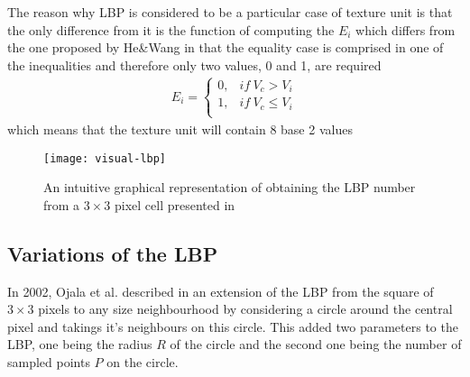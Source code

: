 The reason why LBP is considered to be a particular case of texture unit is that the only difference from it is the function of computing the $E_i$ which differs from the one proposed by He\&Wang in that the equality case is comprised in one of the inequalities and therefore only two values, 0 and 1, are required
\begin{align}
E_i = \begin{cases}
0, & if\ V_c > V_i \\
1, & if\ V_c \leq V_i \\
\end{cases}
\end{align}
which means that the texture unit will contain 8 base 2 values

\begin{figure}[h]
	\begin{center}
		\texttt{[image: visual-lbp]}
	\end{center}
	\caption[Visual representation of \textbf{LBP} computation]{An intuitive graphical representation of obtaining the LBP number from a $3\times3$ pixel cell presented in \cite{lu2014divided}}
\end{figure}

\subsection{Variations of the LBP}
In 2002, Ojala et al. described in \cite{OjalaPM02} an extension of the LBP from the square of $3\times3$ pixels to any size neighbourhood by considering a circle around the central pixel and takings it's neighbours on this circle. This added two parameters to the LBP, one being the radius $R$ of the circle and the second one being the number of sampled points $P$ on the circle. 
